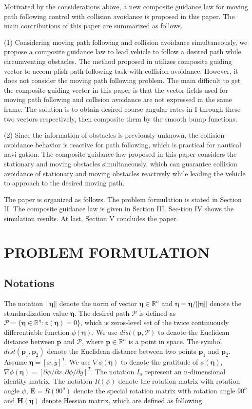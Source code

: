 \documentclass[a4paper, 10pt, conference]{ieeeconf}      %
\begin{document}
Motivated by the considerations above, a new composite guidance law for moving path following control with collision avoidance is proposed in this paper. The main contributions of this paper are summarized as follows.

(1) Considering moving path following and collision avoidance simultaneously, we propose a composite guidance law to lead vehicle to follow a desired path while circumventing obstacles. The method proposed in \cite{c22} utilizes composite guiding vector to accom-plish path following task with collision avoidance. However, it does not consider the moving path following problem. The main difficult to get the composite guiding vector in this paper is that the vector fields used for moving path following and collision avoidance are not expressed in the same frame. The solution is to obtain desired course angular rates in {I} through these two vectors respectively, then composite them by the smooth bump functions.

(2) Since the information of obstacles is previously unknown, the collision-avoidance behavior is reactive for path following, which is practical for nautical navi-gation. The composite guidance law proposed in this paper considers the stationary and moving obstacles simultaneously, which can guarantee collision avoidance of stationary and moving obstacles reactively while leading the vehicle to approach to the desired moving path. 

The paper is organized as follows. The problem formulation is stated in Section II. The composite guidance law is given in Section III. Sec-tion IV shows the simulation results. At last, Section V concludes the paper.


\section{PROBLEM FORMULATION}

\subsection{Notations}

The notation $||\bm{\eta}||$ denote the norm of vector $\bm{\eta}\in \mathbb{R}^{n}$ and $\hat{\bm{\eta}}=\bm{\eta}/||\bm{\eta}||$ denote the standardization value $\bm{\eta}$. The desired path $\mathcal{P}$ is defined as $\mathcal{P}=\{\bm{\eta}\in \mathbb{R}^{\eta}:\phi(\bm{\eta})=0\}$, which is zeros-level set of the twice continuously differentiable function $\phi(\bm{\eta})$. We use $dist(\bm{p},\mathcal{P})$ to denote the Euclidean distance between $\bm{p}$ and $\mathcal{P}$, where $\bm{p}\in \mathbb{R}^{n}$ is a point in space. The symbol $dist(\bm{p}_1,\bm{p}_2)$ denote the Euclidean distance between two points $\bm{p}_1$ and $\bm{p}_2$. Assume $\bm{\eta} =[x,y]^T$. We use $\nabla \phi(\bm{\eta})$ to denote the gratitude of $\phi(\bm{\eta})$, $\nabla \phi(\bm{\eta})=[\partial \phi/\partial x,\partial \phi/\partial y]^T$. The notation $I_{n}$ represent an n-dimensional identity matrix. The notation $R(\psi)$ denote the rotation matrix with rotation angle $\psi$, $\bm{E}=R(90^{o})$ denote the special rotation matrix with rotation angle $90^{o}$ and $\bm{H}(\bm{\eta})$ denote Hessian matrix, which are defined as following.
\end{document}
